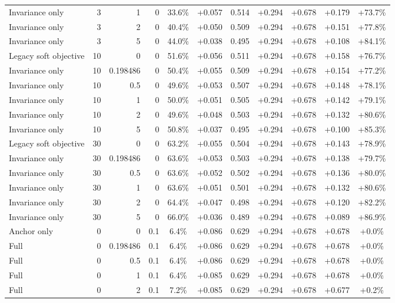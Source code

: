 \begin{table}[htbp]
\begin{tabular}{lrrrccccccc}
Invariance only & 3 & 1 & 0 & 33.6\% & +0.057 & 0.514 & +0.294 & +0.678 & +0.179 & +73.7\% \\
Invariance only & 3 & 2 & 0 & 40.4\% & +0.050 & 0.509 & +0.294 & +0.678 & +0.151 & +77.8\% \\
Invariance only & 3 & 5 & 0 & 44.0\% & +0.038 & 0.495 & +0.294 & +0.678 & +0.108 & +84.1\% \\
Legacy soft objective & 10 & 0 & 0 & 51.6\% & +0.056 & 0.511 & +0.294 & +0.678 & +0.158 & +76.7\% \\
Invariance only & 10 & 0.198486 & 0 & 50.4\% & +0.055 & 0.509 & +0.294 & +0.678 & +0.154 & +77.2\% \\
Invariance only & 10 & 0.5 & 0 & 49.6\% & +0.053 & 0.507 & +0.294 & +0.678 & +0.148 & +78.1\% \\
Invariance only & 10 & 1 & 0 & 50.0\% & +0.051 & 0.505 & +0.294 & +0.678 & +0.142 & +79.1\% \\
Invariance only & 10 & 2 & 0 & 49.6\% & +0.048 & 0.503 & +0.294 & +0.678 & +0.132 & +80.6\% \\
Invariance only & 10 & 5 & 0 & 50.8\% & +0.037 & 0.495 & +0.294 & +0.678 & +0.100 & +85.3\% \\
Legacy soft objective & 30 & 0 & 0 & 63.2\% & +0.055 & 0.504 & +0.294 & +0.678 & +0.143 & +78.9\% \\
Invariance only & 30 & 0.198486 & 0 & 63.6\% & +0.053 & 0.503 & +0.294 & +0.678 & +0.138 & +79.7\% \\
Invariance only & 30 & 0.5 & 0 & 63.6\% & +0.052 & 0.502 & +0.294 & +0.678 & +0.136 & +80.0\% \\
Invariance only & 30 & 1 & 0 & 63.6\% & +0.051 & 0.501 & +0.294 & +0.678 & +0.132 & +80.6\% \\
Invariance only & 30 & 2 & 0 & 64.4\% & +0.047 & 0.498 & +0.294 & +0.678 & +0.120 & +82.2\% \\
Invariance only & 30 & 5 & 0 & 66.0\% & +0.036 & 0.489 & +0.294 & +0.678 & +0.089 & +86.9\% \\
Anchor only & 0 & 0 & 0.1 & 6.4\% & +0.086 & 0.629 & +0.294 & +0.678 & +0.678 & +0.0\% \\
Full & 0 & 0.198486 & 0.1 & 6.4\% & +0.086 & 0.629 & +0.294 & +0.678 & +0.678 & +0.0\% \\
Full & 0 & 0.5 & 0.1 & 6.4\% & +0.086 & 0.629 & +0.294 & +0.678 & +0.678 & +0.0\% \\
Full & 0 & 1 & 0.1 & 6.4\% & +0.085 & 0.629 & +0.294 & +0.678 & +0.678 & +0.0\% \\
Full & 0 & 2 & 0.1 & 7.2\% & +0.085 & 0.629 & +0.294 & +0.678 & +0.677 & +0.2\% \\

\end{tabular}
\end{table}
